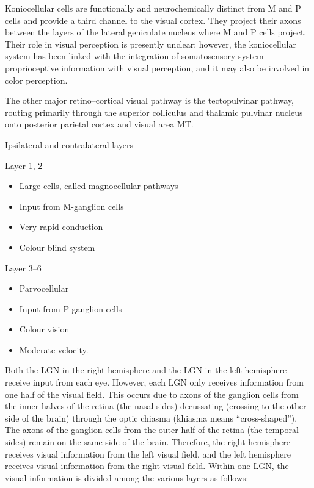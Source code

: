 Koniocellular cells are functionally and neurochemically distinct from M and P cells and provide a third channel to the visual cortex. They project their axons between the layers of the lateral geniculate nucleus where M and P cells project. Their role in visual perception is presently unclear; however, the koniocellular system has been linked with the integration of somatosensory system-proprioceptive information with visual perception, and it may also be involved in color perception.

The other major retino--cortical visual pathway is the tectopulvinar pathway, routing primarily through the superior colliculus and thalamic pulvinar nucleus onto posterior parietal cortex and visual area MT.

Ipsilateral and contralateral layers

Layer 1, 2

\begin{itemize}
\tightlist
\item
  Large cells, called magnocellular pathways
\item
  Input from M-ganglion cells
\item
  Very rapid conduction
\item
  Colour blind system
\end{itemize}

Layer 3--6

\begin{itemize}
\tightlist
\item
  Parvocellular
\item
  Input from P-ganglion cells
\item
  Colour vision
\item
  Moderate velocity.
\end{itemize}

Both the LGN in the right hemisphere and the LGN in the left hemisphere receive input from each eye. However, each LGN only receives information from one half of the visual field. This occurs due to axons of the ganglion cells from the inner halves of the retina (the nasal sides) decussating (crossing to the other side of the brain) through the optic chiasma (khiasma means ``cross-shaped''). The axons of the ganglion cells from the outer half of the retina (the temporal sides) remain on the same side of the brain. Therefore, the right hemisphere receives visual information from the left visual field, and the left hemisphere receives visual information from the right visual field. Within one LGN, the visual information is divided among the various layers as follows:

